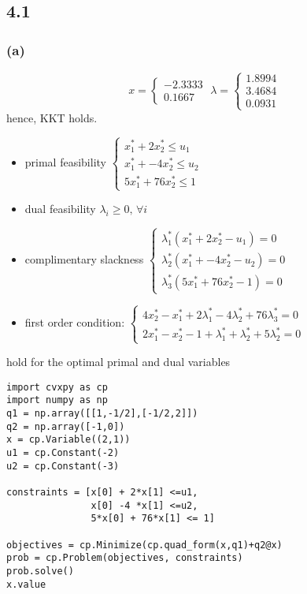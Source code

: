 \documentclass{article}
\begin{document}
 \subsection*{4.1}
 \subsubsection*{(a)}
 \[x = \begin{cases}
 -2.3333 \\
    0.1667
    \end{cases}
  \;
  \lambda = \begin{cases}
 1.8994 \\
    3.4684\\
    0.0931
    \end{cases} 
     \]
     hence, KKT holds.
     \begin{itemize}
\item primal feasibility $\begin{cases}
x_1^* + 2x_2^* \le u_1 \\
x_1^* + -4x_2^* \le u_2 \\
5x_1^* + 76x_2^*\le 1
\end{cases}
$
\item dual feasibility $\lambda_i \ge 0, \, \forall i$
\item complimentary slackness $\begin{cases}
\lambda_1^*(x_1^* + 2x_2^* - u_1)=0\\
\lambda_2^*(x_1^* + -4x_2^* - u_2)=0\\
\lambda_3^*(5x_1^* + 76x_2^* - 1)=0
\end{cases}
$
\item first order condition:  $ \begin{cases}
4x_2^*-x_1^*+2\lambda_1^*-4\lambda_2^*+76\lambda_3^*=0\\
2x_1^* -x_2^*-1+\lambda_1^*+\lambda_2^*+5\lambda_2^*=0
\end{cases}
$
\end{itemize}
hold for the optimal primal and dual variables
 \begin{verbatim}
import cvxpy as cp 
import numpy as np
q1 = np.array([[1,-1/2],[-1/2,2]])
q2 = np.array([-1,0])
x = cp.Variable((2,1))
u1 = cp.Constant(-2)
u2 = cp.Constant(-3)

constraints = [x[0] + 2*x[1] <=u1,
               x[0] -4 *x[1] <=u2,
               5*x[0] + 76*x[1] <= 1]

objectives = cp.Minimize(cp.quad_form(x,q1)+q2@x)
prob = cp.Problem(objectives, constraints)
prob.solve()
x.value
\end{verbatim}
\end{document}
